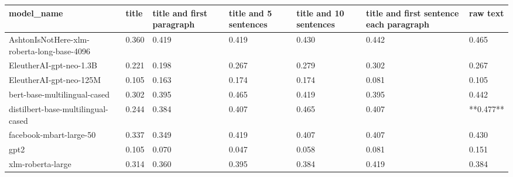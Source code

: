 \begin{tabular}{lllllll}
\toprule
                                model\_name & title & title and first paragraph & title and 5 sentences & title and 10 sentences & title and first sentence each paragraph &  raw text \\
\midrule
AshtonIsNotHere-xlm-roberta-long-base-4096 & 0.360 &                     0.419 &                 0.419 &                  0.430 &                                   0.442 &     0.465 \\
                   EleutherAI-gpt-neo-1.3B & 0.221 &                     0.198 &                 0.267 &                  0.279 &                                   0.302 &     0.267 \\
                   EleutherAI-gpt-neo-125M & 0.105 &                     0.163 &                 0.174 &                  0.174 &                                   0.081 &     0.105 \\
              bert-base-multilingual-cased & 0.302 &                     0.395 &                 0.465 &                  0.419 &                                   0.395 &     0.442 \\
        distilbert-base-multilingual-cased & 0.244 &                     0.384 &                 0.407 &                  0.465 &                                   0.407 & **0.477** \\
                   facebook-mbart-large-50 & 0.337 &                     0.349 &                 0.419 &                  0.407 &                                   0.407 &     0.430 \\
                                      gpt2 & 0.105 &                     0.070 &                 0.047 &                  0.058 &                                   0.081 &     0.151 \\
                         xlm-roberta-large & 0.314 &                     0.360 &                 0.395 &                  0.384 &                                   0.419 &     0.384 \\
\bottomrule
\end{tabular}
